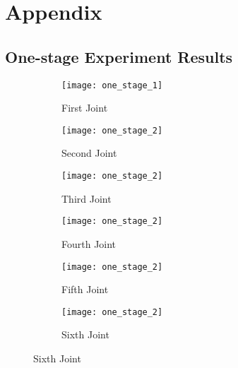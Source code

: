 \chapter*{Appendix}
\renewcommand{\thefigure}{A.\arabic{figure}}
\setcounter{figure}{0}  
\section*{One-stage Experiment Results}
\begin{figure}[H]
  \caption{Plotted data from the result}
  \begin{subfigure}[t]{0.5\textwidth}
    \centering
    \texttt{[image: one\_stage\_1]} 
    \caption{First Joint}
  \end{subfigure}
  \begin{subfigure}[t]{0.5\textwidth}
    \centering
    \texttt{[image: one\_stage\_2]}
    \caption{Second Joint}
  \end{subfigure}
  \begin{subfigure}[t]{0.5\textwidth}
    \centering
    \texttt{[image: one\_stage\_2]}
    \caption{Third Joint}
  \end{subfigure}
  \begin{subfigure}[t]{0.5\textwidth}
    \centering
    \texttt{[image: one\_stage\_2]}
    \caption{Fourth Joint}
  \end{subfigure}
  \begin{subfigure}[t]{0.5\textwidth}
    \centering
    \texttt{[image: one\_stage\_2]}
    \caption{Fifth Joint}
  \end{subfigure}
  \begin{subfigure}[t]{0.5\textwidth}
    \centering
    \texttt{[image: one\_stage\_2]}
    \caption{Sixth Joint}
  \end{subfigure}
  \label{aa}
\end{figure}

